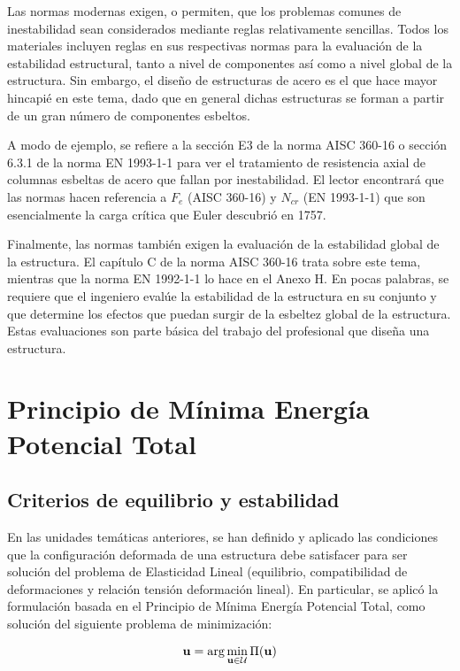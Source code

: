 Las normas modernas exigen, o permiten, que los problemas comunes de inestabilidad sean considerados mediante reglas relativamente sencillas. Todos los materiales incluyen reglas en sus respectivas normas para la evaluación de la estabilidad estructural, tanto a nivel de componentes así como a nivel global de la estructura. %
Sin embargo, el diseño de estructuras de acero es el que hace mayor hincapié en este tema, dado que en general dichas estructuras se forman a partir de un gran número de componentes esbeltos. 

A modo de ejemplo, se refiere a la sección E3 de la norma AISC 360-16 o sección 6.3.1 de la norma EN 1993-1-1 para ver el tratamiento de resistencia axial de columnas esbeltas de acero que fallan por inestabilidad. %
%
El lector encontrará que las normas hacen referencia a $F_e$ (AISC 360-16) y $N_{cr}$ (EN 1993-1-1) que son esencialmente la carga crítica que Euler descubrió en 1757.

Finalmente, las normas también exigen la evaluación de la estabilidad global de la estructura. El capítulo C de la norma AISC 360-16 trata sobre este tema, mientras que la norma EN 1992-1-1 lo hace en el Anexo H. %
%
En pocas palabras, se requiere que el ingeniero evalúe la estabilidad de la estructura en su conjunto y que determine los efectos que puedan surgir de la esbeltez global de la estructura. Estas evaluaciones son parte básica del trabajo del profesional que diseña una estructura.


\section{Principio de Mínima Energía Potencial Total}


\subsection{Criterios de equilibrio y estabilidad} 

En las unidades temáticas anteriores, se han definido y aplicado las condiciones que la configuración deformada de una estructura debe satisfacer para ser solución del problema de Elasticidad Lineal (equilibrio, compatibilidad de deformaciones y relación tensión deformación lineal). En particular, se aplicó la formulación basada en el Principio de Mínima Energía Potencial Total, como solución del siguiente problema de minimización:

\begin{equation*}
{\bf u} = \arg\min_{{\bf u}\in{\mathcal U}} \Pi({\bf u})
\end{equation*}

